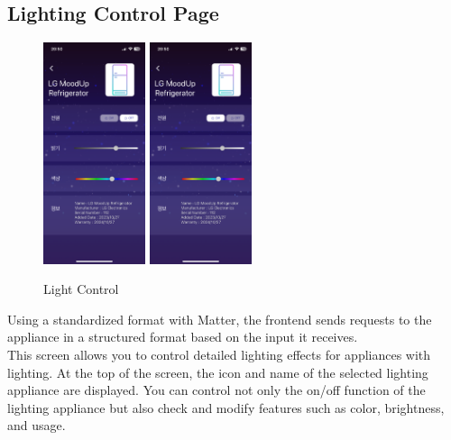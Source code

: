 \documentclass[conference]{IEEEtran}
\begin{document}
    \subsection{Lighting Control Page}
        \begin{figure}[htbp]
            \centerline{\includegraphics[width=3cm]{Images/screen/light/8_LIGHT_SETTING.PNG}
            \includegraphics[width=3cm]{Images/screen/light/9_LIGHT_SETTING_ON.PNG}}
            \caption{Light Control}
            \label{fig}
        \end{figure}
        Using a standardized format with Matter, the frontend sends requests to the appliance in a structured format based on the input it receives.\\
        This screen allows you to control detailed lighting effects for appliances with lighting. At the top of the screen, the icon and name of the selected lighting appliance are displayed. You can control not only the on/off function of the lighting appliance but also check and modify features such as color, brightness, and usage.
\end{document}
